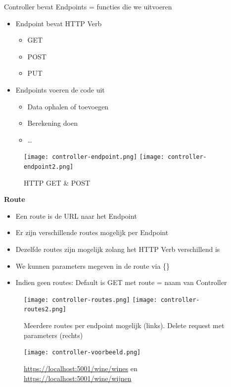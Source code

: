 \documentclass{article}
\begin{document}
Controller bevat Endpoints = functies die we uitvoeren

\begin{itemize}
    \item Endpoint bevat HTTP Verb
    \begin{itemize}
        \item GET
        \item POST
        \item PUT
    \end{itemize}
    \item Endpoints voeren de code uit
    \begin{itemize}
        \item Data ophalen of toevoegen
        \item Berekening doen
        \item \dots
    \end{itemize}
\end{itemize}

\begin{figure}[H]
    \centering
    \texttt{[image: controller-endpoint.png]}
    \texttt{[image: controller-endpoint2.png]}
    \caption{HTTP GET \& POST}
\end{figure}

\textbf{Route}

\begin{itemize}
    \item Een route is de URL naar het Endpoint
    \item Er zijn verschillende routes mogelijk per Endpoint
    \item Dezelfde routes zijn mogelijk zolang het HTTP Verb verschillend is
    \item We kunnen parameters megeven in de route via \{\}
    \item Indien geen routes: Default is GET met route = naam van Controller
\end{itemize}

\begin{figure}[H]
    \centering
    \texttt{[image: controller-routes.png]}
    \texttt{[image: controller-routes2.png]}
    \caption{Meerdere routes per endpoint mogelijk (links). Delete request met parameters (rechts)}
\end{figure}

\begin{figure}[H]
    \centering
    \texttt{[image: controller-voorbeeld.png]}
    \caption{\underline{https://localhost:5001/wine/wines} en \underline{https://localhost:5001/wine/wijnen}}
\end{figure}
\end{document}
